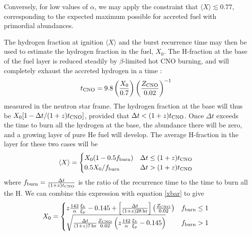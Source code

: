 \documentclass{aastex63}
\begin{document}
Conversely, for low values of $\alpha$, we may apply the constraint that $\langle X\rangle \lesssim 0.77$, corresponding to the expected maximum possible for accreted fuel with primordial abundances.

The hydrogen fraction at ignition $\langle X\rangle$ and the burst recurrence time may then be used to estimate the hydrogen fraction in the fuel, $X_0$. The H-fraction at the base of the fuel layer is reduced steadily by $\beta$-limited hot CNO burning, and will completely exhaust the accreted hydrogen in a time \cite[]{lampe16}:
\begin{equation}
t_{\rm CNO} =9.8\left(\frac{X_0}{0.7}\right) \left(\frac{Z_{\rm CNO}}{0.02}\right)^{-1}
\end{equation}
measured in the neutron star frame.
The hydrogen fraction at the base will thus be $X_0[1-\Delta t/(1+z)t_{\rm CNO}]$, 
%
provided that $\Delta t < (1+z)t_{\rm CNO}$. Once $\Delta t$ exceeds the time to burn all the hydrogen at the base, the abundance there will be zero, and a growing layer of pure He fuel will develop. The average H-fraction in the layer for these two cases will be 
\begin{equation}
\langle X \rangle = \begin{cases}
  X_0(1-0.5f_{\rm burn}) & \Delta t \leq (1+z)t_{\rm CNO} \\
  0.5X_0/f_{\rm burn} & \Delta t > (1+z)t_{\rm CNO}
  \end{cases}
\end{equation}
where $f_{\rm burn} = \frac{\Delta t}{(1+z)t_{\rm CNO}}$ is the ratio of the recurrence time to the time to burn all the H.
%
We can combine this expression with equation \ref{xbar} to give
\begin{equation}
X_0 = \begin{cases}
         z\frac{142}{\alpha}\frac{\xi_b}{\xi_p} - 0.145 
                           +\left[\frac{\Delta t}{(1+z)28\,{\rm hr}}\right]
                       \left(\frac{Z_{\rm CNO}}{0.02}\right) & f_{\rm burn} \leq 1\\
         \sqrt{ \frac{\Delta t}{(1+z)7\,{\rm hr}}\frac{Z_{\rm CNO}}{0.02}
                        \left(z\frac{142}{\alpha}\frac{\xi_b}{\xi_p} - 0.145\right) }
                        & f_{\rm burn} > 1
        \end{cases}
    \label{eq:X_0}
\end{equation}
\end{document}
